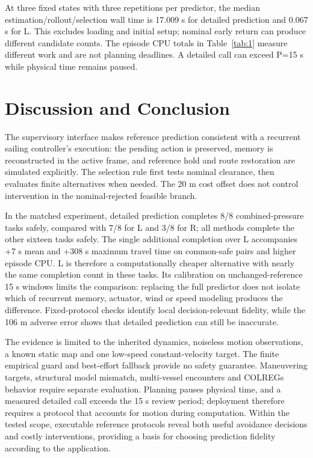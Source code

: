 \documentclass[conference]{IEEEtran}
\begin{document}
At three fixed states with three repetitions per predictor, the median estimation/rollout/selection wall time is 17.009 s for detailed prediction and 0.067 s for L. This excludes loading and initial setup; nominal early return can produce different candidate counts. The episode CPU totals in Table~\ref{tab:1} measure different work and are not planning deadlines. A detailed call can exceed P=15 s while physical time remains paused.

\section{Discussion and Conclusion}

The supervisory interface makes reference prediction consistent with a recurrent sailing controller's execution: the pending action is preserved, memory is reconstructed in the active frame, and reference hold and route restoration are simulated explicitly. The selection rule first tests nominal clearance, then evaluates finite alternatives when needed. The 20 m cost offset does not control intervention in the nominal-rejected feasible branch.

In the matched experiment, detailed prediction completes 8/8 combined-pressure tasks safely, compared with 7/8 for L and 3/8 for R; all methods complete the other sixteen tasks safely. The single additional completion over L accompanies +7 s mean and +308 s maximum travel time on common-safe pairs and higher episode CPU. L is therefore a computationally cheaper alternative with nearly the same completion count in these tasks. Its calibration on unchanged-reference 15 s windows limits the comparison: replacing the full predictor does not isolate which of recurrent memory, actuator, wind or speed modeling produces the difference. Fixed-protocol checks identify local decision-relevant fidelity, while the 106 m adverse error shows that detailed prediction can still be inaccurate.

The evidence is limited to the inherited dynamics, noiseless motion observations, a known static map and one low-speed constant-velocity target. The finite empirical guard and best-effort fallback provide no safety guarantee. Maneuvering targets, structural model mismatch, multi-vessel encounters and COLREGs behavior require separate evaluation. Planning pauses physical time, and a measured detailed call exceeds the 15 s review period; deployment therefore requires a protocol that accounts for motion during computation. Within the tested scope, executable reference protocols reveal both useful avoidance decisions and costly interventions, providing a basis for choosing prediction fidelity according to the application.
\end{document}

